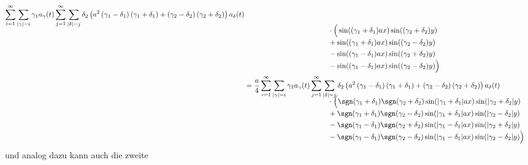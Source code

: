 \begin{align*}
\sum_{i = 1}^{\infty}
\sum_{|\gamma| = i}
\gamma_1
a_{\gamma}(t)
\sum_{j = 1}^{\infty}
\sum_{|\delta| = j}
\delta_2
\left(
a^2 \left(\gamma_1 - \delta_1 \right)\left( \gamma_1 + \delta_1 \right)
+ \left(\gamma_2 - \delta_2 \right)\left( \gamma_2 + \delta_2 \right)
\right)
a_{\delta}(t)
\\[-2ex]
&\phantom{=abbbbb\sum\sum.....{}ccccccc}
\cdot
\Big(
\sin((\gamma_1 + \delta_1) ax)\sin((\gamma_2 + \delta_2) y)
\\[-1ex]
&\phantom{=abbbbb\sum\sum.....{}ccccccc}
+
\sin((\gamma_1 + \delta_1) ax)\sin((\gamma_2 - \delta_2) y)
\\[-1ex]
&\phantom{=abbbbb\sum\sum.....{}ccccccc}
-
\sin((\gamma_1 - \delta_1) ax)\sin((\gamma_2 + \delta_2) y)
\\[-1ex]
&\phantom{=abbbbb\sum\sum.....{}ccccccc}
-
\sin((\gamma_1 - \delta_1) ax)\sin((\gamma_2 - \delta_2) y)
\Big)
\\
&=
\frac{a}{4}
\sum_{i = 1}^{\infty}
\sum_{|\gamma| = i}
\gamma_1
a_{\gamma}(t)
\sum_{j = 1}^{\infty}
\sum_{|\delta| = j}
\delta_2
\left(
a^2 \left(\gamma_1 - \delta_1 \right)\left( \gamma_1 + \delta_1 \right)
+ \left(\gamma_2 - \delta_2 \right)\left( \gamma_2 + \delta_2 \right)
\right)
a_{\delta}(t)
\\[-2ex]
&\phantom{=abbbbb\sum\sum.....{}ccccccc}
\cdot
\Big(
\sgn(\gamma_1 + \delta_1)\sgn(\gamma_2 + \delta_2)
\sin(|\gamma_1 + \delta_1|ax)\sin(|\gamma_2 + \delta_2|y)
\\[-1ex]
&\phantom{=abbbbb\sum\sum.....{}ccccccc}
+
\sgn(\gamma_1 + \delta_1)\sgn(\gamma_2 - \delta_2)
\sin(|\gamma_1 + \delta_1|ax)\sin(|\gamma_2 - \delta_2|y)
\\[-1ex]
&\phantom{=abbbbb\sum\sum.....{}ccccccc}
-
\sgn(\gamma_1 - \delta_1)\sgn(\gamma_2 + \delta_2)
\sin(|\gamma_1 - \delta_1|ax)\sin(|\gamma_2 + \delta_2|y)
\\[-1ex]
&\phantom{=abbbbb\sum\sum.....{}ccccccc}
-
\sgn(\gamma_1 - \delta_1)\sgn(\gamma_2 - \delta_2)
\sin(|\gamma_1 - \delta_1|ax)\sin(|\gamma_2 - \delta_2|y)
\Big)
\end{align*}
und analog dazu kann auch die zweite
